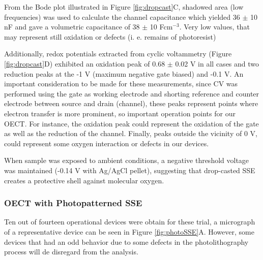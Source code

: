 From the Bode plot illustrated in Figure \ref{fig:dropcast}C, shadowed area (low frequencies) was used to calculate the channel capacitance which yielded 36 $\pm$ 10 nF and gave a volumetric capacitance of 38 $\pm$ 10 Fcm$^{-3}$. Very low values, that may represent still oxidation or defects (i. e. remains of photoresist)

Additionally, redox potentials extracted from cyclic voltammetry (Figure \ref{fig:dropcast}D) exhibited an oxidation peak of 0.68 $\pm$ 0.02 V in all cases and two reduction peaks at the -1 V (maximum negative gate biased) and -0.1 V. An important consideration to be made for these measurements, since CV was performed using the gate as working electrode and shorting reference and counter electrode between source and drain (channel), these peaks represent points where electron transfer is more prominent, so important operation points for our OECT. For instance, the oxidation peak could represent the oxidation of the gate as well as the reduction of the channel. Finally, peaks outside the vicinity of 0 V, could represent some oxygen interaction or defects in our devices.

When sample was exposed to ambient conditions, a negative threshold voltage was maintained (-0.14 V with Ag/AgCl pellet), suggesting that drop-casted SSE creates a protective shell against molecular oxygen.

\subsubsection{OECT with Photopatterned SSE} %
Ten out of fourteen operational devices were obtain for these trial, a micrograph of a representative device can be seen in Figure \ref{fig:photoSSE}A. However, some devices that had an odd behavior due to some defects in the photolithography process will de disregard from the analysis.


